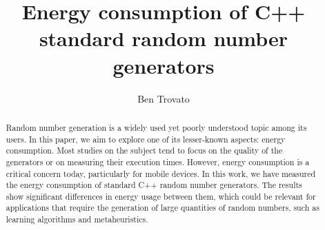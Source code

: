 \documentclass[sigconf]{acmart}
\begin{document}
\title{Energy consumption of C++ standard random number generators}
\subtitle{}

\renewcommand{\shorttitle}{Energy consumption of C++ standard random number generators}

\author{Ben Trovato}

\renewcommand{\shortauthors}{B. Trovato}

\begin{abstract}
Random number generation is a widely used yet poorly understood topic among its users. In this paper, we aim to explore one of its lesser-known aspects: energy consumption. Most studies on the subject tend to focus on the quality of the generators or on measuring their execution times. However, energy consumption is a critical concern today, particularly for mobile devices. In this work, we have measured the energy consumption of standard C++ random number generators. The results show significant differences in energy usage between them, which could be relevant for applications that require the generation of large quantities of random numbers, such as learning algorithms and metaheuristics.
\end{abstract}
\end{document}
